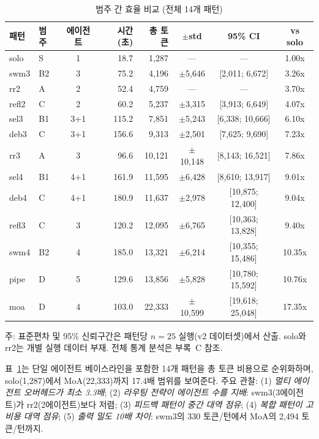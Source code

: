 \documentclass[a4paper,11pt]{article}
\begin{document}
\begin{table}[H]
\centering
\caption{범주 간 효율 비교 (전체 14개 패턴)}
\label{tab:all-patterns}
{\footnotesize
\begin{tabular}{llcrrccc}
\toprule
패턴 & 범주 & 에이전트 & 시간(초) & 총 토큰 & $\pm$std & 95\% CI & vs solo \\
\midrule
solo  & S  & 1   & 18.7  & 1,287  & ---       & ---               & 1.00x \\
swm3  & B2 & 3   & 75.2  & 4,196  & $\pm$5,646 & [2,011; 6,672]   & 3.26x \\
rr2   & A  & 2   & 52.4  & 4,759  & ---       & ---               & 3.70x \\
refl2 & C  & 2   & 60.2  & 5,237  & $\pm$3,315 & [3,913; 6,649]   & 4.07x \\
sel3  & B1 & 3+1 & 115.2 & 7,851  & $\pm$5,243 & [6,338; 10,666]  & 6.10x \\
deb3  & C  & 3+1 & 156.6 & 9,313  & $\pm$2,501 & [7,625; 9,690]   & 7.23x \\
rr3   & A  & 3   & 96.6  & 10,121 & $\pm$10,148 & [8,143; 16,521] & 7.86x \\
sel4  & B1 & 4+1 & 161.9 & 11,595 & $\pm$6,428 & [8,610; 13,917]  & 9.01x \\
deb4  & C  & 4+1 & 180.9 & 11,637 & $\pm$2,978 & [10,875; 12,400] & 9.04x \\
refl3 & C  & 3   & 120.2 & 12,095 & $\pm$6,765 & [10,363; 13,828] & 9.40x \\
swm4  & B2 & 4   & 185.0 & 13,321 & $\pm$6,214 & [10,355; 15,486] & 10.35x \\
pipe  & D  & 5   & 129.6 & 13,856 & $\pm$5,828 & [10,780; 15,592] & 10.76x \\
moa   & D  & 4   & 103.0 & 22,333 & $\pm$10,599 & [19,618; 25,048] & 17.35x \\
\bottomrule
\end{tabular}
}

\smallskip
{\footnotesize 주: 표준편차 및 95\% 신뢰구간은 패턴당 $n=25$ 실행(v2 데이터셋)에서 산출. solo와 rr2는 개별 실행 데이터 부재. 전체 통계 분석은 부록~C 참조.}
\end{table}

표~\ref{tab:all-patterns}는 단일 에이전트 베이스라인을 포함한 14개 패턴을 총 토큰 비용으로 순위화하며, solo(1,287)에서 MoA(22,333)까지 17.4배 범위를 보여준다. 주요 관찰: (1) \emph{멀티 에이전트 오버헤드가 최소 3.3배}; (2) \emph{라우팅 전략이 에이전트 수를 지배}: swm3(3에이전트)가 rr2(2에이전트)보다 저렴; (3) \emph{피드백 패턴이 중간 대역 점유}; (4) \emph{복합 패턴이 고비용 대역 점유}; (5) \emph{출력 밀도 10배 차이}: swm3의 330 토큰/턴에서 MoA의 2,494 토큰/턴까지.
\end{document}
